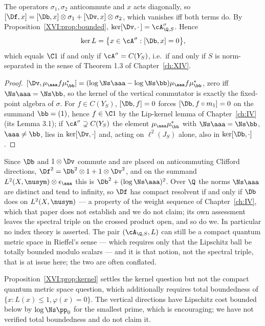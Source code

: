 \begin{proposition}[Kernel]\label{XVI:prop:kernel}
The operators $\sigma_1,\sigma_2$ anticommute and $x$ acts diagonally, so
$[\Df,x]=[\Db,x]\otimes\sigma_1+[\Dv,x]\otimes\sigma_2$, which vanishes iff both terms do. By
Proposition~\ref{XVI:prop:bounded}, $\ker[\Dv,\cdot\,]=\cA^\sigma_{\Q,S}$. Hence
\[
\ker L=\bigl\{x\in\cA^\sigma:[\Db,x]=0\bigr\},
\]
which equals $\C1$ if and only if $\cA^\sigma=C(Y_S)$, i.e.\ if and only if $S$ is
norm-separated in the sense of Theorem 1.3 of Chapter~\ref{ch:XIV}.
\end{proposition}

\begin{proof}
$[\Dv,\mu_\aaa f\mu_\bb^*]=(\log\Ns\aaa-\log\Ns\bb)\mu_\aaa f\mu_\bb^*$, zero iff
$\Ns\aaa=\Ns\bb$, so the kernel of the vertical commutator is exactly the fixed-point algebra
of $\sigma$. For $f\in C(Y_S)$, $[\Db,f]=0$ forces $[\Db,f\circ m_1]=0$ on the summand
$\bb=(1)$, hence $f\in\C1$ by the Lip-kernel lemma of Chapter~\ref{ch:IV} (its Lemma 3.1); if
$\cA^\sigma\supsetneq C(Y_S)$ the element $\mu_\aaa\mu_\bb^*$ with $\Ns\aaa=\Ns\bb$,
$\aaa\ne\bb$, lies in $\ker[\Dv,\cdot]$ and, acting on $\ell^2(J_S)$ alone, also in
$\ker[\Db,\cdot]$.
\end{proof}

\begin{remark}\label{XVI:rem:notriple}
Since $\Db$ and $1\otimes\Dv$ commute and are placed on anticommuting Clifford directions,
$\Df^2=\Db^2\otimes1+1\otimes\Dv^2$, and on the summand $L^2(X,\nusym)\otimes\epsilon_\aaa$
this is $\Db^2+(\log\Ns\aaa)^2$. Over $\Q$ the norms $\Ns\aaa$ are distinct and tend to
infinity, so $\Df$ has compact resolvent if and only if $\Db$ does on $L^2(X,\nusym)$ ---
a property of the weight sequence of Chapter~\ref{ch:IV}, which that paper does not establish and we do
not claim; its own assessment leaves the spectral triple on the crossed product open, and so
do we. In particular no index theory is asserted. The pair $(\cA_{\Q,S},L)$ can still be a
compact quantum metric space in Rieffel's sense \cite{Rieffel} --- which requires only that
the Lipschitz ball be totally bounded modulo scalars --- and it is that notion, not the
spectral triple, that is at issue here; the two are often conflated.
\end{remark}

\begin{remark}\label{XVI:rem:openone}
Proposition~\ref{XVI:prop:kernel} settles the kernel question but not the compact quantum metric
space question, which additionally requires total boundedness of
$\{x:L(x)\le1,\varphi(x)=0\}$. The vertical directions have Lipschitz cost bounded below by
$\log\Ns\pp_0$ for the smallest prime, which is encouraging; we have not verified total
boundedness and do not claim it.
\end{remark}

